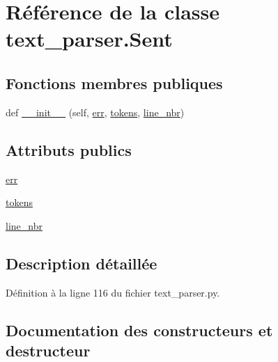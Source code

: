 \hypertarget{classtext__parser_1_1_sent}{}\section{Référence de la classe text\+\_\+parser.\+Sent}
\label{classtext__parser_1_1_sent}
\subsection*{Fonctions membres publiques}
\begin{DoxyCompactItemize}
\item 
def \hyperlink{classtext__parser_1_1_sent_a672f7c0390e82d5357626911f15fa119}{\+\_\+\+\_\+init\+\_\+\+\_\+} (self, \hyperlink{classtext__parser_1_1_sent_ad46681c1b1eb1536bb99c2750c4b9d56}{err}, \hyperlink{classtext__parser_1_1_sent_ac8e5a72834e623d4b0e84bdd1d0a431a}{tokens}, \hyperlink{classtext__parser_1_1_sent_ae4027e6a93dde191b41848ab4f4d95b4}{line\+\_\+nbr})
\end{DoxyCompactItemize}
\subsection*{Attributs publics}
\begin{DoxyCompactItemize}
\item 
\hyperlink{classtext__parser_1_1_sent_ad46681c1b1eb1536bb99c2750c4b9d56}{err}
\item 
\hyperlink{classtext__parser_1_1_sent_ac8e5a72834e623d4b0e84bdd1d0a431a}{tokens}
\item 
\hyperlink{classtext__parser_1_1_sent_ae4027e6a93dde191b41848ab4f4d95b4}{line\+\_\+nbr}
\end{DoxyCompactItemize}


\subsection{Description détaillée}


Définition à la ligne 116 du fichier text\+\_\+parser.\+py.



\subsection{Documentation des constructeurs et destructeur}
\hypertarget{classtext__parser_1_1_sent_a672f7c0390e82d5357626911f15fa119}{}
